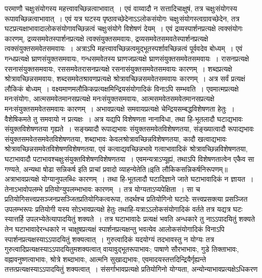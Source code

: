 परमाणौ चक्षुःसंयोगस्य महत्त्वावच्छिन्नत्वाभावात्~। एवं वाय्वादौ न सत्तादिचाक्षुषं, तत्र चक्षुःसंयोगस्य रूपावच्छिन्नत्वाभावात्~। एवं यत्र घटस्य पृष्ठावच्छेदेनाऽऽलोकसंयोगः
चक्षुःसंयोगस्त्वग्रावच्छेदेन, तत्र घटप्रत्यक्षाभावादालोकसंयोगावच्छिन्नत्वं चक्षुःसंयोगे विशेषणं देयम्~।
एवं द्रव्यस्पार्शनप्रत्यक्षे त्वक्संयोगः कारणम्, द्रव्यसमवेतस्पार्शनप्रत्यक्षे त्वक्संयुक्तसमवायः, द्रव्यसमवेतसमवतेस्पार्शनप्रत्यक्षे त्वक्संयुक्तसमवेतसमवायः~। अत्राऽपि
महत्त्वावच्छिन्नत्वमुद्भूतस्पर्शावच्छिन्नत्वं पूर्ववदेव बोध्यम्~।
एवं गन्धप्रत्यक्षे घ्राणसंयुक्तसमवायः, गन्धसमवेतस्य घ्राणजप्रत्यक्षे घ्राणसंयुक्तसमवेतसमवायः~।
रासनप्रत्यक्षे रसनासंयुक्तसमवायः, रससमवेतरासनप्रत्यक्षे रसनासंयुक्तसमवेतसमवायः कारणम्~।
शब्दप्रत्यक्षे श्रोत्रावच्छिन्नसमवायः, शब्दसमवेतश्रावणप्रत्यक्षे श्रोत्रावच्छिन्नसमवेतसमवायः कारणम्~।
अत्र सर्वं प्रत्यक्षं लौकिकं बोध्यम्~। वक्ष्यमाणमलौकिकप्रत्यक्षमिन्द्रियसंयोगादिकं विनाऽपि सम्भवति~।
एवमात्मप्रत्यक्षे मनःसंयोगः, आत्मसमवेतमानसप्रत्यक्षे मनःसंयुक्तसमवायः, आत्मसमवेतसमवेतमानसप्रत्यक्षे मनःसंयुक्तसमवेतसमवायः कारणम्~।
अभावप्रत्यक्षे समवायप्रत्यक्षे चेन्द्रियसम्बद्धविशेषणता हेतुः~। वैशेषिकमते तु समवायो न प्रत्यक्षः~। अत्र यद्यपि विशेषणता नानाविधा, तथा हि-भूतलादौ
घटाद्यभावः संयुक्तविशेषणतया गृह्यते~। सङ्ख्यादौ रूपाद्यभावः संयुक्तसमवेतविशेषणतया, संङ्ख्यात्वादौ रूपाद्यभावः संयुक्तसमवेतसमवेतविशेषणतया, शब्दाभावः
केवलश्रोत्रावच्छिन्नविशेषणतया, कादौ खत्वाद्यभावः श्रोत्रावच्छिन्नसमवेतविशेषणविशेषणतया, एवं कत्वाद्यवच्छिन्नभावे गत्वाभावादिकं श्रोत्रावच्छिन्नविशेषणतया, घटाभावादौ
पटाभावश्चक्षुःसंयुक्तविशेषणविशेषणतया~। एवमन्यत्राऽप्यूह्यं, तथाऽपि विशेषणतात्वेन एकैव सा गण्यते, अन्यथा षोढा सन्निकर्ष इति प्राचां प्रवादो व्याहन्येतेति॥इति
लौकिकसन्निकर्षनिरूपणम्॥
अत्राभावप्रत्यक्षे योग्यानुपलब्धिः कारणम्~। तथा हि-भूतलादौ घटादिज्ञाने जाते घटाभावादिकं न ज्ञायत~। तेनाऽभावोपलम्भे प्रतियोग्युपलम्भाभावः कारणम्~। तत्र
योग्यताऽप्यपेक्षिता~। सा च प्रतियोगिसत्त्वप्रसञ्जनप्रसञ्जितप्रतियोगिकत्वरूपा, तदर्थश्च प्रतियोगिनो घटादेः सत्त्वप्रसक्त्या प्रसञ्जित उपलम्भरूपः प्रतियोगी यस्य
सोऽभावप्रत्यक्षे हेतुः तथाहि-यत्राऽऽलोकसंयोगादिकं वर्तते तत्र यद्यत्र घटः स्यात्तर्हि उपलभ्येतेत्यापादयितुं शक्यते~। तत्र घटाभावादेः प्रत्यक्षं भवति अन्धकारे तु
नाऽऽपादयितुं शक्यते तेन घटाभावादेरन्धकारे न चाक्षुषप्रत्यक्षं स्पार्शनप्रत्यक्षन्तु भवत्येव आलोकसंयोगादिकं विनाऽपि स्पार्शनप्रत्यक्षस्याऽऽपादयितुं शक्यत्वात्~।
गुरुत्वादिकं यदयोग्यं तदभावस्तु न योग्यः तत्र गुरुत्वादिप्रत्यक्षस्याऽऽपादयितुमशक्यत्वात् वायावुद्भूतरूपाभावः; पाषाणे सौरभाभावः, गुडे तिक्ताभावः, वह्नावनुष्णत्वाभावः,
श्रोत्रे शब्दाभावः, आत्मनि सुखाद्यभावः, एवमादयस्तत्तदिन्द्रियैर्गृह्यन्ते तत्तत्प्रत्यक्षस्याऽऽपादयितुं शक्यत्वात्~। संसर्गाभावप्रत्यक्षे प्रतियोगिनो योग्यता, अन्योन्याभावप्रत्यक्षेऽधिकरण
